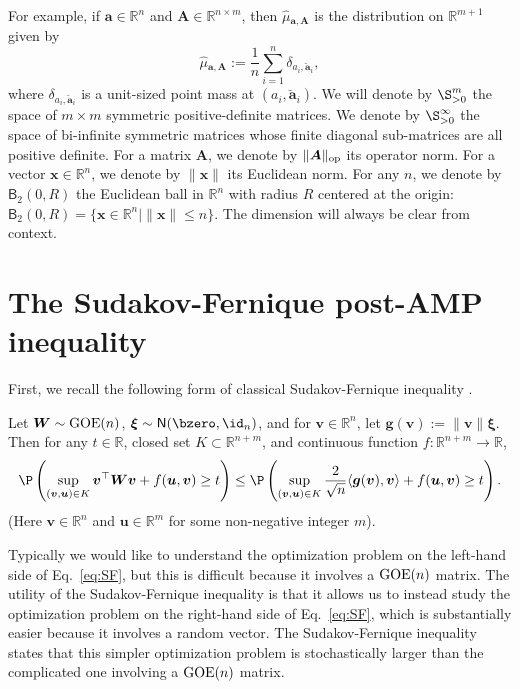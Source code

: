 \documentclass[]{article}
\def\op{{\rm op}}
\def\bx{{\boldsymbol x}}
\def\bW{{\boldsymbol W}}
\def\ba{{\boldsymbol a}}
\def\normal{{\sf N}}
\def\bv{{\boldsymbol V}}
\def\bu{{\boldsymbol u}}
\def\bg{{\boldsymbol g}}
\def\bA{{\boldsymbol A}}
\def\bv{{\boldsymbol v}}
\def\bxi{{\boldsymbol \xi}}
\def\reals{{\mathbb R}}
\def\bx{{\boldsymbol x}}
\def\bW{{\boldsymbol W}}
\def\ba{{\boldsymbol a}}
\def\bv{{\boldsymbol v}}
\def\normal{{\sf N}}
\def\bu{{\boldsymbol u}}
\def\bg{{\boldsymbol g}}
\def\bA{{\boldsymbol A}}
\def\GOE{{\rm GOE}}
\def\muhat{\widehat{\mu}{}}
\def\sB{\mathsf{B}}
\begin{document}
For example, if $\ba \in \reals^n$ and $\bA \in \reals^{n \times m}$,
then $\muhat_{\ba,\bA}$ is the distribution on $\reals^{m + 1}$ given by
\begin{equation}
    \muhat_{\ba,\bA} := \frac1n \sum_{i=1}^n \delta_{a_i,\breve\ba_i},
\end{equation}
where $\delta_{a_i,\breve\ba_i}$ is a unit-sized point mass at $(a_i,\breve\ba_i)$.
We will denote by $\S_{>0}^m$ the space of $m\times m$ symmetric positive-definite matrices.
We denote by $\S_{>0}^\infty$ the space of bi-infinite symmetric matrices whose finite diagonal sub-matrices are all positive definite.
For a matrix $\bA$,
we denote by $\| \bA \|_{\op}$ its operator norm.
For a vector $\bx \in \reals^n$,
we denote by $\| \bx \|$ its Euclidean norm.  
For any $n$, we denote by $\sB_2(0,R)$ the Euclidean ball in $\reals^n$ with radius $R$ centered at the origin: $\sB_2(0,R) = \{ \bx \in \reals^n \mid \| \bx \| \leq n\}$.
The dimension will always be clear from context.

\section{The Sudakov-Fernique post-AMP inequality}
\label{sec:SF-post-AMP}

First, we recall the following form of classical Sudakov-Fernique inequality 
\cite{sudakov1971gaussian,sudakov1979geometric, fernique1975regularite}.
\begin{proposition}\label{lem:slepian}
    Let $\bW \sim \GOE(n)$,
    $\bxi \sim \normal(\bzero,\id_n)$,
    and for $\bv \in \reals^n$,
    let $\bg(\bv) := \| \bv \| \bxi$.
    Then for any $t \in \reals$,
    closed set $K \subset \reals^{n+m}$,
    and continuous function $f:\reals^{n+m} \rightarrow \reals$,
    \begin{equation}
    \label{eq:SF}
        \P\left(\sup_{(\bv,\bu) \in K} \bv^\top \bW \bv + f(\bu,\bv) \geq t\right)
        \leq \P\left(\sup_{(\bv,\bu) \in K} \frac{2}{\sqrt{n}}
        \langle \bg(\bv) , \bv \rangle+f(\bu,\bv) \geq t\right).
    \end{equation}
    (Here $\bv \in \reals^n$ and $\bu \in \reals^m$ for some non-negative integer $m$).
\end{proposition}
\noindent Typically we would like to understand the optimization problem on the left-hand side of Eq.~\eqref{eq:SF},
but this is difficult because it involves a $\GOE(n)$ matrix.
The utility of the Sudakov-Fernique inequality is that it allows us to instead study the optimization problem on the right-hand side of Eq.~\eqref{eq:SF}, which is substantially easier because it involves a random vector. 
The Sudakov-Fernique inequality states that this simpler optimization problem is stochastically larger than the complicated one involving a $\GOE(n)$ matrix.
\end{document}
